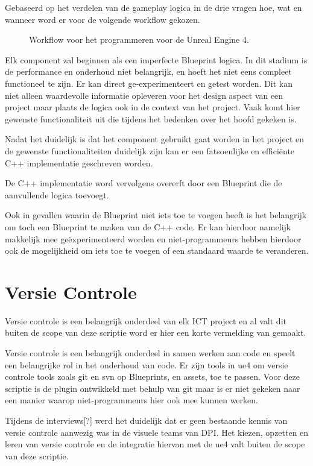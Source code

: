 Gebaseerd op het verdelen van de gameplay logica in de drie vragen hoe, wat en wanneer word er voor de volgende workflow gekozen.
    
\begin{figure}[H]
	\centering
		\caption{Workflow voor het programmeren voor de Unreal Engine 4.}
\end{figure}

Elk component zal beginnen als een imperfecte Blueprint logica. In dit stadium is de performance en onderhoud niet belangrijk, en hoeft het niet eens compleet functioneel te zijn. Er kan direct ge-experimenteert en getest worden. Dit kan niet alleen waardevolle informatie opleveren voor het design aspect van een project maar plaats de logica ook in de context van het project. Vaak komt hier gewenste functionaliteit uit die tijdens het bedenken over het hoofd gekeken is.

Nadat het duidelijk is dat het component gebruikt gaat worden in het project en de gewenste functionaliteiten duidelijk zijn kan er een fatsoenlijke en efficiënte C++ implementatie geschreven worden.

De C++ implementatie word vervolgens overerft door een Blueprint die de aanvullende logica toevoegt.

Ook in gevallen waarin de Blueprint niet iets toe te voegen heeft is het belangrijk om toch een Blueprint te maken van de C++ code. Er kan hierdoor namelijk makkelijk mee geëxperimenteerd worden en niet-programmeurs hebben hierdoor ook de mogelijkheid om iets toe te voegen of een standaard waarde te veranderen.

\section{Versie Controle}
Versie controle is een belangrijk onderdeel van elk ICT project en al valt dit buiten de scope van deze scriptie word er hier een korte vermelding van gemaakt.

Versie controle is een belangrijk onderdeel in samen werken aan code en speelt een belangrijke rol in het onderhoud van code. Er zijn tools in \gls{ue4} om versie controle tools zoals git en svn op Blueprints, en assets, toe te passen. Voor deze scriptie is de plugin ontwikkeld met behulp van git maar is er niet gekeken naar een manier waarop niet-programmeurs hier ook mee kunnen werken.

Tijdens de interviews[?] werd het duidelijk dat er geen bestaande kennis van versie controle aanwezig was in de visuele teams van DPI. Het kiezen, opzetten en leren van versie controle en de integratie hiervan met de \gls{ue4} valt buiten de scope van deze scriptie.